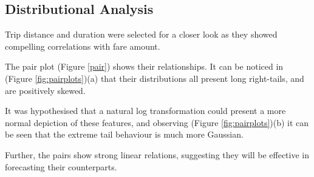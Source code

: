 \documentclass[11pt]{article}
\begin{document}
\subsection{Distributional Analysis}
Trip distance and duration were selected for a closer look as they showed compelling correlations with fare amount.

The pair plot (Figure \ref{pair}) shows their relationships. It can be noticed in (Figure \ref{fig:pairplots})(a) that their distributions all present long right-tails, and are positively skewed.

It was hypothesised that a natural log transformation could present a more normal depiction of these features, and observing (Figure \ref{fig:pairplots})(b) it can be seen that the extreme tail behaviour is much more Gaussian.

Further, the pairs show strong linear relations, suggesting they will be effective in forecasting their counterparts.
\end{document}
